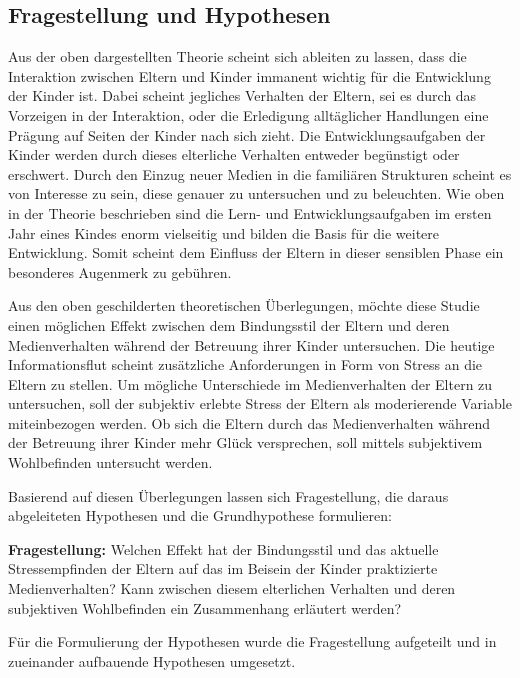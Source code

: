 \subsection{Fragestellung und Hypothesen} \label{sec:Fragestellung}
Aus der oben dargestellten Theorie scheint sich ableiten zu lassen, dass die Interaktion zwischen Eltern und Kinder immanent wichtig für die Entwicklung der Kinder ist. Dabei scheint jegliches Verhalten der Eltern, sei es durch das Vorzeigen in der Interaktion, oder die Erledigung alltäglicher Handlungen eine Prägung auf Seiten der Kinder nach sich zieht. Die Entwicklungsaufgaben der Kinder werden durch dieses elterliche Verhalten entweder begünstigt oder erschwert. Durch den Einzug neuer Medien in die familiären Strukturen scheint es von Interesse zu sein, diese genauer zu untersuchen und zu beleuchten. Wie oben in der Theorie beschrieben sind die Lern- und Entwicklungsaufgaben im ersten Jahr eines Kindes enorm vielseitig und bilden die Basis für die weitere Entwicklung. Somit scheint dem Einfluss der Eltern in dieser sensiblen Phase ein besonderes Augenmerk zu gebühren. 

Aus den oben geschilderten theoretischen Überlegungen, möchte diese Studie einen möglichen Effekt zwischen dem Bindungsstil der Eltern und deren Medienverhalten während der Betreuung ihrer Kinder untersuchen. Die heutige Informationsflut scheint zusätzliche Anforderungen in Form von Stress an die Eltern zu stellen. Um mögliche Unterschiede im Medienverhalten der Eltern zu untersuchen, soll der subjektiv erlebte Stress der Eltern als moderierende Variable miteinbezogen werden. Ob sich die Eltern durch das Medienverhalten während der Betreuung ihrer Kinder mehr Glück versprechen, soll mittels subjektivem Wohlbefinden untersucht werden.

Basierend auf diesen Überlegungen lassen sich Fragestellung, die daraus abgeleiteten Hypothesen und die Grundhypothese formulieren:

\textbf{Fragestellung:}
Welchen Effekt hat der Bindungsstil und das aktuelle Stressempfinden der Eltern auf das im Beisein der Kinder praktizierte Medienverhalten? Kann zwischen diesem elterlichen Verhalten und deren subjektiven Wohlbefinden ein Zusammenhang erläutert werden?

Für die Formulierung der Hypothesen wurde die Fragestellung aufgeteilt und in zueinander aufbauende Hypothesen umgesetzt. 

